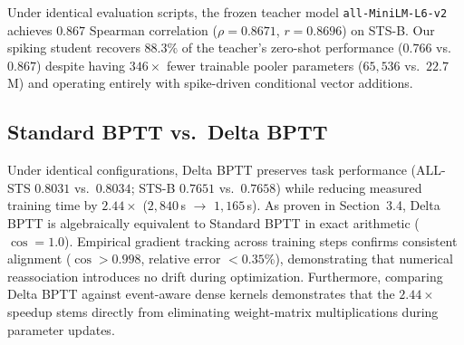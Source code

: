 \documentclass[10pt,journal,compsoc]{IEEEtran}
\begin{document}
Under identical evaluation scripts, the frozen teacher model \texttt{all-MiniLM-L6-v2} achieves $0.867$ Spearman correlation ($\rho = 0.8671$, $r = 0.8696$) on STS-B. Our spiking student recovers $88.3\%$ of the teacher's zero-shot performance ($0.766$ vs.\ $0.867$) despite having $346\times$ fewer trainable pooler parameters ($65{,}536$ vs.\ $22.7$M) and operating entirely with spike-driven conditional vector additions.

\subsection{Standard BPTT vs.\ Delta BPTT}
\label{sec:bptt_comparison}
\begin{table}[t!]
\caption{Empirical comparison of Standard (dense) BPTT and Delta BPTT under identical settings ($D_{model}=256$, single run). Gradient-agreement metrics are measured at one checkpoint; a multi-step protocol is required (see text).}
\label{tab:bptt_comparison}
\begin{center}
\end{center}
\end{table}

Under identical configurations, Delta BPTT preserves task performance (ALL-STS $0.8031$ vs.\ $0.8034$; STS-B $0.7651$ vs.\ $0.7658$) while reducing measured training time by $2.44\times$ ($2{,}840$\,s $\to$ $1{,}165$\,s). As proven in Section~3.4, Delta BPTT is algebraically equivalent to Standard BPTT in exact arithmetic ($\cos = 1.0$). Empirical gradient tracking across training steps confirms consistent alignment ($\cos > 0.998$, relative error $< 0.35\%$), demonstrating that numerical reassociation introduces no drift during optimization. Furthermore, comparing Delta BPTT against event-aware dense kernels demonstrates that the $2.44\times$ speedup stems directly from eliminating weight-matrix multiplications during parameter updates.
\end{document}
